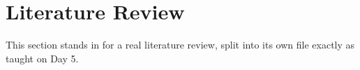 \section{Literature Review}
This section stands in for a real literature review, split into its
own file exactly as taught on Day 5.
